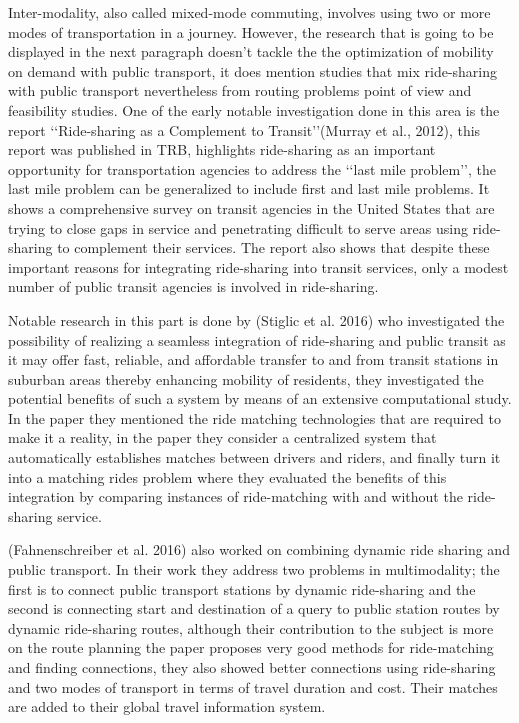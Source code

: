 \documentclass{article}
\begin{document}
Inter-modality, also called mixed-mode commuting, involves using two or more modes of transportation in a journey. However, the research that is going to be displayed in the next paragraph doesn\rq{t} tackle the the optimization of mobility on demand with public transport, it does mention studies that mix ride-sharing with public transport nevertheless from routing problems point of view and feasibility studies.  
One of the early notable investigation done in this area is the report \lq\lq{Ride-sharing as a Complement to Transit}\rq\rq (Murray et al., 2012)\cite{Murray14655}, this report was published in TRB, highlights ride-sharing as an important opportunity for transportation
agencies to address the \lq\lq{last mile problem}\rq\rq, the last mile problem can be generalized to include first and last mile problems. It shows a comprehensive survey on transit agencies in the United States that are trying to close gaps in service and penetrating difficult to serve areas using ride-sharing to complement their services. The report also shows that despite these important reasons for integrating ride-sharing into transit services, only a modest number of public transit agencies is involved in ride-sharing. 

Notable research in this part is done by (Stiglic et al. 2016)\citep{STIGLIC201812} who investigated the possibility of realizing a seamless integration of ride-sharing and public transit as it may offer fast, reliable, and affordable transfer to and from transit stations in suburban areas thereby enhancing mobility of residents, they investigated the potential benefits of such a system by means of an extensive computational study. In the paper they mentioned the ride matching technologies that are required to make it a reality, in the paper they consider a centralized system that automatically establishes matches between drivers and riders, and finally turn it into a matching rides problem where they evaluated the benefits of this integration by comparing instances of ride-matching with and without the ride-sharing service. 

(Fahnenschreiber et al. 2016) \cite{FAHNENSCHREIBER2016176} also worked on combining dynamic ride sharing and public transport. In their work they address two problems in multimodality; the first is to connect public transport stations by dynamic ride-sharing and the second is connecting start and destination of a query to public station routes by dynamic ride-sharing routes, although their contribution to the subject is more on the route planning the paper proposes very good methods for ride-matching and finding connections, they also showed better connections using ride-sharing and two modes of transport in terms of travel duration and cost. Their matches are added to their global travel information system. 
\end{document}
